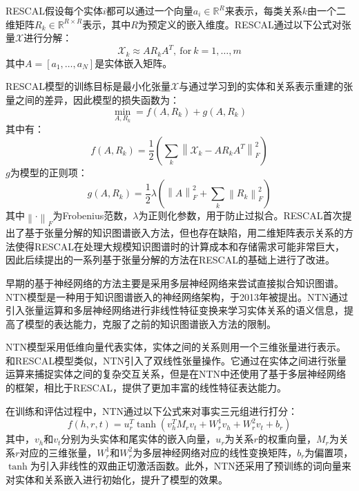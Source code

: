RESCAL假设每个实体$i$都可以通过一个向量$a_i \in \mathbb{R}^R$来表示，每类关系$k$由一个二维矩阵$R_k \in  \mathbb{R}^{R \times R}$表示，其中$R$为预定义的嵌入维度。RESCAL通过以下公式对张量$\mathcal{X}$进行分解：
\begin{equation}
  \mathcal{X}_k \approx A R_k A^T, \ \mbox{for} \ k=1,\ldots, m
\end{equation}
其中$A = [a_1,\ldots,a_N]$是实体嵌入矩阵。

RESCAL模型的训练目标是最小化张量$\mathcal{X}$与通过学习到的实体和关系表示重建的张量之间的差异，因此模型的损失函数为：
\begin{equation}
  \min_{A,R_k} = f(A,R_k)+g(A,R_k)
\end{equation}
其中有：
\begin{equation}
  f(A,R_k)=\frac{1}{2}\left(\sum_k \left\lVert \mathcal{X}_k - AR_kA^T\right\rVert^2_F \right) 
\end{equation}
$g$为模型的正则项：
\begin{equation}
  g(A,R_k)=\frac{1}{2}\lambda \left(\left\lVert A\right\rVert^2_F+\sum_k\left\lVert R_k\right\rVert^2_F  \right) 
\end{equation}
其中$\left\lVert \cdot \right\rVert _F $为Frobenius范数，$\lambda$为正则化参数，用于防止过拟合。RESCAL首次提出了基于张量分解的知识图谱嵌入方法，但也存在缺陷，用二维矩阵表示关系的方法使得RESCAL在处理大规模知识图谱时的计算成本和存储需求可能非常巨大，因此后续提出的一系列基于张量分解的方法在RESCAL的基础上进行了改进。

早期的基于神经网络的方法主要是采用多层神经网络来尝试直接拟合知识图谱。NTN模型是一种用于知识图谱嵌入的神经网络架构，于2013年被提出。NTN通过引入张量运算和多层神经网络进行非线性特征变换来学习实体关系的语义信息，提高了模型的表达能力，克服了之前的知识图谱嵌入方法的限制。

NTN模型采用低维向量代表实体，实体之间的关系则用一个三维张量进行表示。和RESCAL模型类似，NTN引入了双线性张量操作。它通过在实体之间进行张量运算来捕捉实体之间的复杂交互关系，但是在NTN中还使用了基于多层神经网络的框架，相比于RESCAL，提供了更加丰富的线性特征表达能力。

在训练和评估过程中，NTN通过以下公式来对事实三元组进行打分：
\begin{equation}
  f(h,r,t) = u_r^T \tanh\left(v_h^T M_r v_t + W_r^1v_h + W_r^2v_t + b_r\right) 
\end{equation}
其中，$v_h$和$v_t$分别为头实体和尾实体的嵌入向量，$u_r$为关系$r$的权重向量，$M_r$为关系$r$对应的三维张量，$W_r^1$和$W_r^2$为多层神经网络对应的线性变换矩阵，$b_r$为偏置项，$\tanh$为引入非线性的双曲正切激活函数。此外，NTN还采用了预训练的词向量来对实体和关系嵌入进行初始化，提升了模型的效果。

